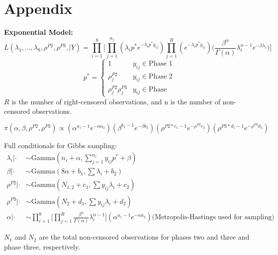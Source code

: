 \documentclass[12pt]{article}
\begin{document}
\section{Appendix}
\textbf{Exponential Model:}
\begin{equation*}
L(\lambda_1, ..., \lambda_8, \rho^{P2}, \rho^{P3}, \vert Y) = \prod_{i = 1}^8
  \Bigg[\prod_{j = 1}^{n_j}(\lambda_i p^*e^{-\lambda_i p^* y_{ij}})\prod_{j =
  1}^R(e^{-\lambda_i p^*
  y_{ij}})\Big(\frac{\beta^\alpha}{\Gamma(\alpha)}\lambda_i^{\alpha -
  1}e^{-\beta\lambda_i}\Big)\Bigg]
\end{equation*}
\[p^* =   \left\{
\begin{array}{ll}
      1 & y_{ij}\in \text{Phase 1} \\
      \rho_{j}^{P2} & y_{ij} \in \text{Phase 2} \\
      \rho_{j}^{P2} \rho_{j}^{P3} & y_{ij} \in \text{Phase }
\end{array}
\right. \]
$R$ is the number of right-censored observations, and n is the number of
non-censored observations.

\begin{equation*}
\pi(\alpha, \beta, \rho^{P2}, \rho^{P3}) \propto (\alpha^{a_1-1}e^{-\alpha
  a_2})(\beta^{b_1 - 1}e^{-\beta b_2})(\rho^{P2*c_1 - 1}e^{-\rho^{P2}
  c_2})(\rho^{P3*d_1 - 1}e^{-\rho^{P3} d_2})
\end{equation*}

Full conditionals for Gibbs sampling:
\begin{align*}
\lambda_i|\cdot &\sim \text{Gamma}(n_i + \alpha, \sum_{j=1}^{n_i}y_{ij}p^* + \beta) \\
\beta|\cdot &\sim \text{Gamma}(8\alpha + b_1, \sum{\lambda_i} + b_2) \\
\rho^{P2}|\cdot &\sim \text{Gamma}(N_{1,2} + c_1, \sum{y_{ij}\lambda_i} + c_2) \\
\rho^{P3}|\cdot &\sim \text{Gamma}(N_{2} + d_1, \sum{y_{ij}\lambda_i} + d_2) \\
\alpha|\cdot &\sim \prod_{i = 1}^8 \Bigg[\prod_{j =1}^R \frac{\beta^\alpha}{\Gamma(\alpha)}\lambda_i^{\alpha -
  1}\Bigg] (\alpha^{a_1-1}e^{-\alpha a_2}) \text{(Metropolis-Hastings used for sampling)}
\end{align*}

$N_1$ and $N_2$ are the total non-censored observations for phases two and three
and phase three, respectively.
\end{document}

